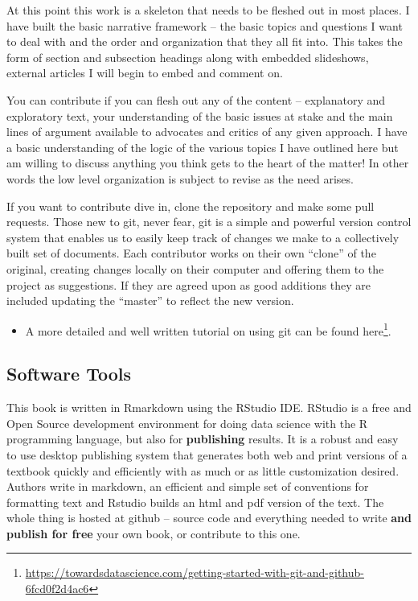 \documentclass[
  12pt, openany]{book}
\providecommand{\tightlist}{%
  \setlength{\itemsep}{0pt}\setlength{\parskip}{0pt}}
\renewcommand{\href}[2]{#2\footnote{\url{#1}}}
\begin{document}
At this point this work is a skeleton that needs to be fleshed out in most places. I have built the basic narrative framework -- the basic topics and questions I want to deal with and the order and organization that they all fit into. This takes the form of section and subsection headings along with embedded slideshows, external articles I will begin to embed and comment on.

You can contribute if you can flesh out any of the content -- explanatory and exploratory text, your understanding of the basic issues at stake and the main lines of argument available to advocates and critics of any given approach. I have a basic understanding of the logic of the various topics I have outlined here but am willing to discuss anything you think gets to the heart of the matter! In other words the low level organization is subject to revise as the need arises.

If you want to contribute dive in, clone the repository and make some pull requests. Those new to git, never fear, git is a simple and powerful version control system that enables us to easily keep track of changes we make to a collectively built set of documents. Each contributor works on their own ``clone'' of the original, creating changes locally on their computer and offering them to the project as suggestions. If they are agreed upon as good additions they are included updating the ``master'' to reflect the new version.

\begin{itemize}
\tightlist
\item
  A more detailed and well written tutorial \href{https://towardsdatascience.com/getting-started-with-git-and-github-6fcd0f2d4ac6}{on using git can be found here}.
\end{itemize}

\hypertarget{software-tools}{%
\subsection{Software Tools}\label{software-tools}}

This book is written in Rmarkdown using the RStudio IDE. RStudio is a free and Open Source development environment for doing data science with the R programming language, but also for \textbf{publishing} results. It is a robust and easy to use desktop publishing system that generates both web and print versions of a textbook quickly and efficiently with as much or as little customization desired. Authors write in markdown, an efficient and simple set of conventions for formatting text and Rstudio builds an html and pdf version of the text. The whole thing is hosted at github -- source code and everything needed to write \textbf{and publish for free} your own book, or contribute to this one.
\end{document}
